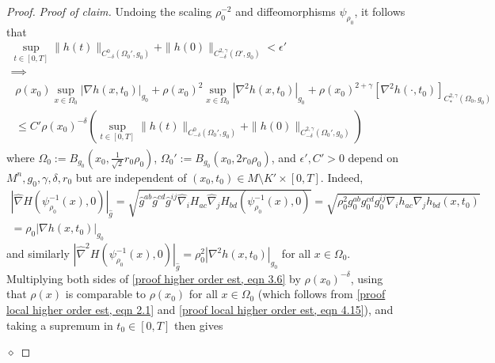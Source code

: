 \documentclass[12pt]{amsart}
\renewcommand{\1}{{\mathbf 1}}
\newenvironment{claimproof}{\par\noindent\textit{Proof of claim.}\space}{\hfill$\diamond$\medskip\par}
\theoremstyle{others}
\numberwithin{equation}{section}
\begin{document}
\begin{proof}
\begin{claimproof}
        Undoing the scaling $\rho_0^{-2}$ and diffeomorphisms $\psi_{\rho_0}$, it follows that
        \begin{gather} 
        \label{proof higher order est, eqn 3.5}
            \sup_{t \in [0, T]} \| h(t) \|_{C^{0}_{-\delta} (\Omega_0' , g_0) } + \| h ( 0)\|_{C^{2, \gamma}_{-\delta}(\Omega', g_0)} <  \epsilon' \\
            \nonumber
            \implies \\
            \label{proof higher order est, eqn 3.6}
            \begin{split}
            \rho(x_0) \sup_{x \in \Omega_0} | \nabla h (x, t_0) |_{g_0} + \rho(x_0)^2 \sup_{x \in \Omega_0} | \nabla^2 h(x, t_0) |_{g_0} + \rho(x_0)^{2 + \gamma} [ \nabla^2 h (\cdot , t_0) ]_{C^{2, \gamma}_* (\Omega_0, g_0 ) } \\
            \le C'\rho(x_0)^{-\delta} \left( \sup_{t \in [0, T]} \| h(t) \|_{C^{0}_{-\delta} (\Omega_0', g_0)} + \| h ( 0)\|_{C^{2, \gamma}_{-\delta} (\Omega_0' , g_0)} \right) 
            \end{split}
        \end{gather}
        where 
        $\Omega_0 := B_{ g_0} \left(  x_0 , \frac1{\sqrt2} r_0 \rho_0 \right)$,
        $\Omega_0' := B_{ g_0}( x_0 , 2 r_0 \rho_0)$, and
        $\epsilon', C'>0$ depend on $M^n, g_0, \gamma, \delta, r_0$ but are independent of $(x_0, t_0) \in M \setminus K' \times [0, T]$.
        Indeed,
        \begin{multline*}
            |\hat \nabla H (\psi_{\rho_0}^{-1} (x) , 0) |_{\hat g}
            = \sqrt{\hat g^{ab} \hat g^{cd} \hat g^{ij} \hat \nabla_i H_{ac} \hat \nabla_j H_{bd} (\psi_{\rho_0}^{-1}(x), 0)} 
            = \sqrt{\rho_0^2 g_0^{ab} g_0^{cd} g_0^{ij} \nabla_i h _{ac} \nabla_j h_{bd}(x, t_0)} \\
            = \rho_0 | \nabla h(x, t_0) |_{g_0}
        \end{multline*}
        and similarly $| \hat \nabla^2 H (\psi_{\rho_0}^{-1}(x), 0) |_{\hat g} = \rho_0^2 | \nabla^2 h (x, t_0) |_{g_0}$ for all $x \in \Omega_0$.
        Multiplying both sides of \eqref{proof higher order est, eqn 3.6} by $\rho(x_0)^{-\delta}$,
        using that $\rho(x)$ is comparable to $\rho(x_0)$ for all $x \in \Omega_0$ (which follows from \eqref{proof local higher order est, eqn 2.1} and \eqref{proof local higher order est, eqn 4.15}), and taking a supremum in $t_0 \in [0, T]$ then gives 

\end{claimproof}
\end{proof}
\end{document}
